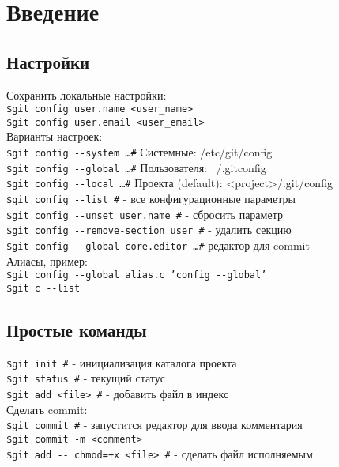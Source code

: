 
\section{Введение}

\subsection{Настройки}

Сохранить локальные настройки: \\
\indent \texttt{\$git config user.name <user\_name>} \\
\indent \texttt{\$git config user.email <user\_email>} \\

\noindent Варианты настроек: \\
\indent \texttt{\$git config {-}-system \ldots \indent \#} Системные: /etc/git/config \\
\indent \texttt{\$git config {-}-global \ldots \indent \#} Пользователя: ~/.gitconfig \\
\indent \texttt{\$git config {-}-local \ldots \indent \#}  Проекта (default):	<project>/.git/config \\

\noindent\texttt{\$git config {-}-list \indent \#} - все конфигурационные параметры \\
\texttt{\$git config {-}-unset user.name \indent \#} - сбросить параметр \\ 
\texttt{\$git config {-}-remove-section user \indent \#} - удалить секцию \\ 
\texttt{\$git config {-}-global core.editor \ldots \indent \#} редактор для commit \\

\noindent Алиасы, пример: \\
\indent\texttt{\$git config {-}-global alias.c 'config {-}-global'} \\
\indent\texttt{\$git c {-}-list}


\subsection{Простые команды}

\texttt{\$git init \indent \#} - инициализация каталога проекта \\
\texttt{\$git status \indent \#} - текущий статус \\
\texttt{\$git add <file> \indent \#} - добавить файл в индекс \\
Сделать commit:\\
\indent\texttt{\$git commit \indent \#} - запустится редактор для ввода комментария \\
\indent\texttt{\$git commit -m <comment>} \\
\texttt{\$git add {-}- chmod=+x <file> \indent \#} - сделать файл исполняемым \\

